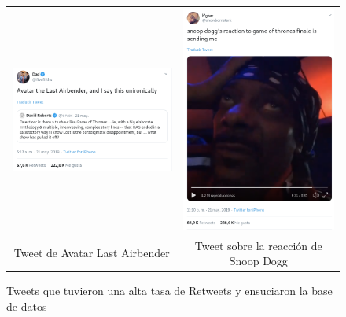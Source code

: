 \begin{figure}[H]
	\centering
	\begin{tabular}{c c}
		
		\includegraphics[scale=.3]{imagenes/airbender.png}
		&  \includegraphics[scale=.3]{imagenes/snoop.png} \\ 
		
		{Tweet de Avatar Last Airbender}
		
		&  {Tweet sobre la reacción de Snoop Dogg} \\ 
		
	\end{tabular} 
	\caption{Tweets que tuvieron una alta tasa de Retweets y ensuciaron la base de datos}
	\label{fig:retweets}
\end{figure}


